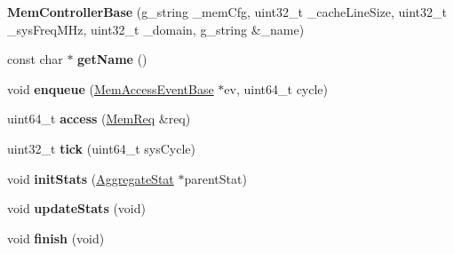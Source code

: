 \begin{DoxyCompactItemize}
\item 
\hypertarget{classMemControllerBase_a3cb4e5c7ae504117be8c6ff15502dcc6}{{\bfseries Mem\-Controller\-Base} (g\-\_\-string \-\_\-mem\-Cfg, uint32\-\_\-t \-\_\-cache\-Line\-Size, uint32\-\_\-t \-\_\-sys\-Freq\-M\-Hz, uint32\-\_\-t \-\_\-domain, g\-\_\-string \&\-\_\-name)}\label{classMemControllerBase_a3cb4e5c7ae504117be8c6ff15502dcc6}

\item 
\hypertarget{classMemControllerBase_ac85a1504e9c0652e1612d59badde0032}{const char $\ast$ {\bfseries get\-Name} ()}\label{classMemControllerBase_ac85a1504e9c0652e1612d59badde0032}

\item 
\hypertarget{classMemControllerBase_a4cd70799a3c1edb0af291878f5a9a773}{void {\bfseries enqueue} (\hyperlink{classMemAccessEventBase}{Mem\-Access\-Event\-Base} $\ast$ev, uint64\-\_\-t cycle)}\label{classMemControllerBase_a4cd70799a3c1edb0af291878f5a9a773}

\item 
\hypertarget{classMemControllerBase_a5db8f1b19708c92ae85e3797bf6d6f8b}{uint64\-\_\-t {\bfseries access} (\hyperlink{structMemReq}{Mem\-Req} \&req)}\label{classMemControllerBase_a5db8f1b19708c92ae85e3797bf6d6f8b}

\item 
\hypertarget{classMemControllerBase_ac926fe00ab34f86ed5f2fb398668f978}{uint32\-\_\-t {\bfseries tick} (uint64\-\_\-t sys\-Cycle)}\label{classMemControllerBase_ac926fe00ab34f86ed5f2fb398668f978}

\item 
\hypertarget{classMemControllerBase_a9703e0e4f3b0846c3560f10f6e11492e}{void {\bfseries init\-Stats} (\hyperlink{classAggregateStat}{Aggregate\-Stat} $\ast$parent\-Stat)}\label{classMemControllerBase_a9703e0e4f3b0846c3560f10f6e11492e}

\item 
\hypertarget{classMemControllerBase_ab575ace5f9c765308ab6aa3ca64d5559}{void {\bfseries update\-Stats} (void)}\label{classMemControllerBase_ab575ace5f9c765308ab6aa3ca64d5559}

\item 
\hypertarget{classMemControllerBase_a4c23cd0fbf82abc036fa0050cf752d60}{void {\bfseries finish} (void)}\label{classMemControllerBase_a4c23cd0fbf82abc036fa0050cf752d60}

\end{DoxyCompactItemize}

